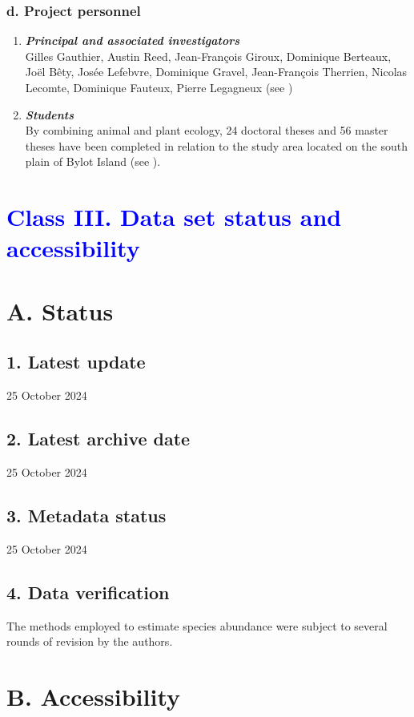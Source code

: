 \documentclass[a4paper,twoside,12pt]{article}
\begin{document}
                \subsubsection*{d. Project personnel}
                \begin{enumerate}[label=\alph*.]
                        \item[] \textit{\textbf{Principal and associated investigators}}\\
                        Gilles Gauthier, Austin Reed, Jean-François Giroux, Dominique Berteaux, Joël Bêty, Josée Lefebvre, Dominique Gravel, Jean-François Therrien, Nicolas Lecomte, Dominique Fauteux, Pierre Legagneux (see \citet{gauthier2024b})
                        \item[] \textit{\textbf{Students}}\\
                        By combining animal and plant ecology, 24 doctoral theses and 56 master theses have been completed in relation to the study area located on the south plain of Bylot Island (see \citet{gauthier2024b}).
                \end{enumerate}
\newpage 
 \section*{\textcolor{Blue}{Class III. Data set status and accessibility}}
    \section*{A. Status}
                \subsection*{1. Latest update} 25 October 2024
        \subsection*{2. Latest archive date} 25 October 2024
        \subsection*{3. Metadata status} 25 October 2024
        \subsection*{4. Data verification} The methods employed to estimate species abundance were subject to several rounds of revision by the authors.
   \section*{B. Accessibility}
\end{document}
